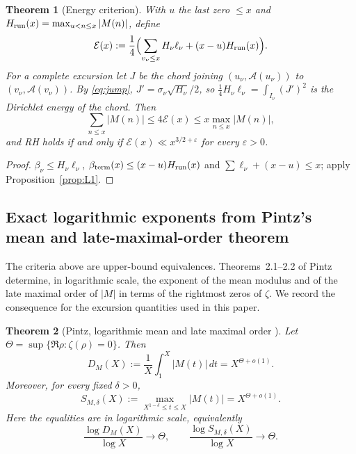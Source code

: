 \documentclass[11pt]{amsart}
\numberwithin{equation}{section}
\theoremstyle{plain}
\newtheorem{theorem}{Theorem}[section]
\theoremstyle{definition}
\theoremstyle{remark}
\newcommand{\Anet}{\mathcal{A}}
\newcommand{\eps}{\varepsilon}
\newcommand{\En}{\mathcal{E}}
\begin{document}
\begin{theorem}[Energy criterion]
\label{thm:energy}
With $u$ the last zero $\le x$ and $H_{\rm run}(x)=\max_{u<n\le x}|M(n)|$,
define
\begin{equation}
\label{eq:energy_def}
  \En(x):=\frac14\Bigl(\sum_{v_\nu\le x}H_\nu\ell_\nu+(x-u)H_{\rm run}(x)\Bigr).
\end{equation}
For a complete excursion let $J$ be the chord joining
$(u_\nu,\Anet(u_\nu))$ to $(v_\nu,\Anet(v_\nu))$. By \eqref{eq:jump},
$J'=\sigma_\nu\sqrt{H_\nu}/2$, so $\tfrac14H_\nu\ell_\nu=\int_{I_\nu}(J')^2$
is the Dirichlet energy of the chord. Then
\begin{equation}
\label{eq:energy_sandwich}
  \sum_{n\le x}|M(n)|\le4\En(x)\le x\max_{n\le x}|M(n)|,
\end{equation}
and RH holds if and only if $\En(x)\ll x^{3/2+\eps}$ for every $\eps>0$.
\end{theorem}

\begin{proof}
$\beta_\nu\le H_\nu\ell_\nu$, $\beta_{\rm term}(x)\le(x-u)H_{\rm run}(x)$ and
$\sum\ell_\nu+(x-u)\le x$; apply Proposition~\ref{prop:L1}.
\end{proof}

\subsection{Exact logarithmic exponents from Pintz's mean and late-maximal-order theorem}
\label{subsec:pintz-exponents}

The criteria above are upper-bound equivalences.  Theorems~2.1--2.2 of
Pintz~\cite{Pintz2026} determine, in logarithmic scale, the exponent of the
mean modulus and of the late maximal order of $|M|$ in terms of the
rightmost zeros of $\zeta$.
We record the consequence for the excursion quantities used in this paper.

\begin{theorem}[Pintz, logarithmic mean and late maximal order
{\cite[Theorems~2.1--2.2]{Pintz2026}}]
\label{thm:pintz-2026}
Let $\Theta=\sup\{\Re\rho:\zeta(\rho)=0\}$.  Then
\[
 D_M(X):=\frac1X\int_1^X|M(t)|\,dt=X^{\Theta+o(1)}.
\]
Moreover, for every fixed $\delta>0$,
\[
 S_{M,\delta}(X):=\max_{X^{1-\delta}\le t\le X}|M(t)|
 =X^{\Theta+o(1)}.
\]
Here the equalities are in logarithmic scale, equivalently
\[
 \frac{\log D_M(X)}{\log X}\to\Theta,
 \qquad
 \frac{\log S_{M,\delta}(X)}{\log X}\to\Theta.
\]
\end{theorem}
\end{document}

